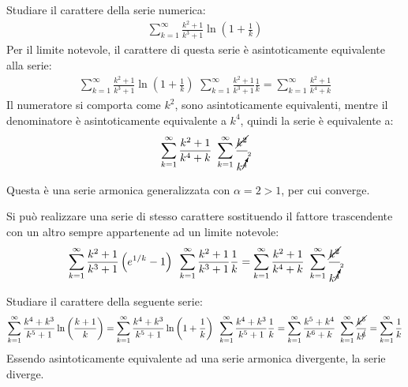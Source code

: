 \documentclass{article}
\numberwithin{equation}{subsection}
\begin{document}
Studiare il carattere della serie numerica:
\begin{gather*}
    \displaystyle\sum_{k=1}^\infty\frac{k^2+1}{k^3+1}\ln\left(1+\frac{1}{k}\right)
\end{gather*}
Per il limite notevole, il carattere di questa serie è asintoticamente equivalente alla serie:
\begin{gather*}
    \displaystyle\sum_{k=1}^\infty\frac{k^2+1}{k^3+1}\ln\left(1+\frac{1}{k}\right)\mbox{~}
    \displaystyle\sum_{k=1}^\infty\frac{k^2+1}{k^3+1}\frac{1}{k}=
    \displaystyle\sum_{k=1}^\infty\frac{k^2+1}{k^4+k}
\end{gather*}
Il numeratore si comporta come $k^2$, sono asintoticamente equivalenti, mentre il denominatore è asintoticamente equivalente a $k^4$, quindi la serie è equivalente a:
\begin{gather*}
    \displaystyle\sum_{k=1}^\infty\frac{k^2+1}{k^4+k}\mbox{~}
    \displaystyle\sum_{k=1}^\infty\frac{\cancel{k^2}}{k^{\cancelto{2}{4}}}
\end{gather*}

Questa è una serie armonica generalizzata con $\alpha=2>1$, per cui converge. 


Si può realizzare una serie di stesso carattere sostituendo il fattore trascendente con un altro sempre appartenente ad un limite notevole:
\begin{gather*}
    \displaystyle\sum_{k=1}^\infty\frac{k^2+1}{k^3+1}\left(e^{1/k}-1\right)\mbox{~}
    \displaystyle\sum_{k=1}^\infty\frac{k^2+1}{k^3+1}\frac{1}{k}=
    \displaystyle\sum_{k=1}^\infty\frac{k^2+1}{k^4+k}\mbox{~}
    \displaystyle\sum_{k=1}^\infty\frac{\cancel{k^2}}{k^{\cancelto{2}{4}}}
\end{gather*}



Studiare il carattere della seguente serie:
\begin{gather*}
    \displaystyle\sum_{k=1}^\infty\frac{k^4+k^3}{k^5+1}\ln\left(\frac{k+1}{k}\right)=
    \displaystyle\sum_{k=1}^\infty\frac{k^4+k^3}{k^5+1}\ln\left(1+\frac{1}{k}\right)\mbox{~}
    \displaystyle\sum_{k=1}^\infty\frac{k^4+k^3}{k^5+1}\frac{1}{k}=
    \displaystyle\sum_{k=1}^\infty\frac{k^5+k^4}{k^6+k}\mbox{~}
    \displaystyle\sum_{k=1}^\infty\frac{\cancel{k^5}}{k^{\cancel{6}}}=
    \displaystyle\sum_{k=1}^\infty\frac{1}{k}
\end{gather*}
Essendo asintoticamente equivalente ad una serie armonica divergente, la serie diverge. 
\end{document}
